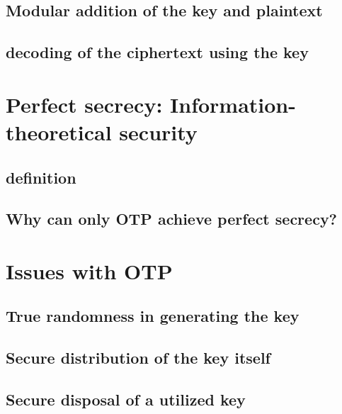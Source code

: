 \documentclass[12pt]{report}
\begin{document}
\subsection{Modular addition of the key and plaintext}
\subsection{decoding of the ciphertext using the key}
\section{Perfect secrecy: Information-theoretical security}
\subsection{definition}
\subsection{Why can only OTP achieve perfect secrecy?}
\section{Issues with OTP}
\subsection{True randomness in generating the key}
\subsection{Secure distribution of the key itself}
\subsection{Secure disposal of a utilized key}

\printbibliography
\end{document}
